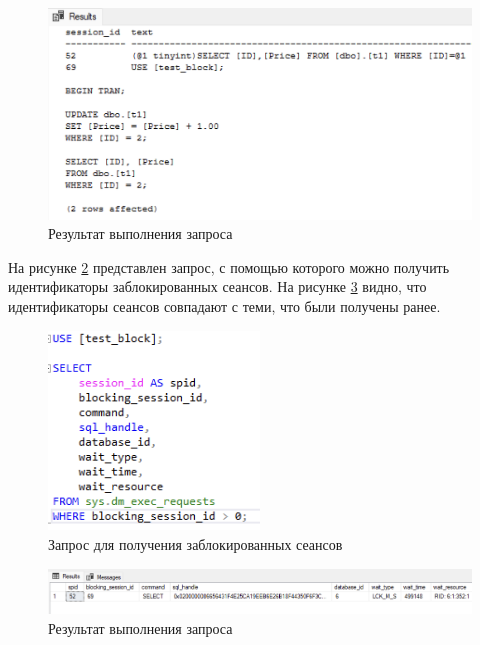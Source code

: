 \documentclass[a4paper, 14pt]{extarticle}
\begin{document}
\begin{figure}[H]
  \centering
  \includegraphics[width=\textwidth]{images/task-2/10.png}
  \caption{Результат выполнения запроса}
  \label{fig:task-2-10}
\end{figure}

На рисунке \ref{fig:task-2-11} представлен запрос, с помощью которого можно
получить идентификаторы заблокированных сеансов. На рисунке \ref{fig:task-2-12}
видно, что идентификаторы сеансов совпадают с теми, что были получены ранее.

\begin{figure}[H]
  \centering
  \includegraphics[width=0.5\textwidth]{images/task-2/11.png}
  \caption{Запрос для получения заблокированных сеансов}
  \label{fig:task-2-11}
\end{figure}

\begin{figure}[H]
  \centering
  \includegraphics[width=\textwidth]{images/task-2/12.png}
  \caption{Результат выполнения запроса}
  \label{fig:task-2-12}
\end{figure}
\end{document}
